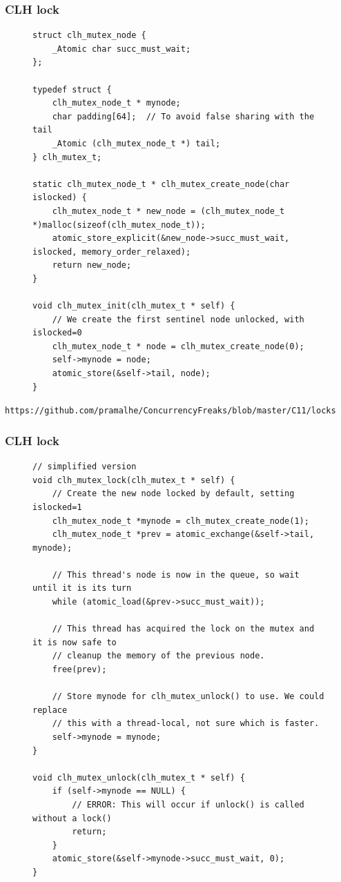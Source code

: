 \documentclass[aspectratio=169, pdf, 8pt, unicode]{beamer}
\begin{document}
\begin{frame}[fragile]
\frametitle{CLH lock}
\begin{figure}[H]
\begin{minipage}{0.8\textwidth}
\small
\begin{verbatim}
struct clh_mutex_node {
    _Atomic char succ_must_wait;
};

typedef struct {
    clh_mutex_node_t * mynode;
    char padding[64];  // To avoid false sharing with the tail
    _Atomic (clh_mutex_node_t *) tail;
} clh_mutex_t;

static clh_mutex_node_t * clh_mutex_create_node(char islocked) {
    clh_mutex_node_t * new_node = (clh_mutex_node_t *)malloc(sizeof(clh_mutex_node_t));
    atomic_store_explicit(&new_node->succ_must_wait, islocked, memory_order_relaxed);
    return new_node;
}

void clh_mutex_init(clh_mutex_t * self) {
    // We create the first sentinel node unlocked, with islocked=0
    clh_mutex_node_t * node = clh_mutex_create_node(0);
    self->mynode = node;
    atomic_store(&self->tail, node);
}
\end{verbatim}
\end{minipage}
\end{figure}
\texttt{https://github.com/pramalhe/ConcurrencyFreaks/blob/master/C11/locks}
\end{frame}

\begin{frame}[fragile]
\frametitle{CLH lock}
\begin{figure}[H]
\begin{minipage}{0.8\textwidth}
\small
\begin{verbatim}
// simplified version
void clh_mutex_lock(clh_mutex_t * self) {
    // Create the new node locked by default, setting islocked=1
    clh_mutex_node_t *mynode = clh_mutex_create_node(1);
    clh_mutex_node_t *prev = atomic_exchange(&self->tail, mynode);

    // This thread's node is now in the queue, so wait until it is its turn
    while (atomic_load(&prev->succ_must_wait));

    // This thread has acquired the lock on the mutex and it is now safe to
    // cleanup the memory of the previous node.
    free(prev);

    // Store mynode for clh_mutex_unlock() to use. We could replace
    // this with a thread-local, not sure which is faster.
    self->mynode = mynode;
}

void clh_mutex_unlock(clh_mutex_t * self) {
    if (self->mynode == NULL) {
        // ERROR: This will occur if unlock() is called without a lock()
        return;
    }
    atomic_store(&self->mynode->succ_must_wait, 0);
}
\end{verbatim}
\end{minipage}
\end{figure}
\end{frame}
\end{document}
